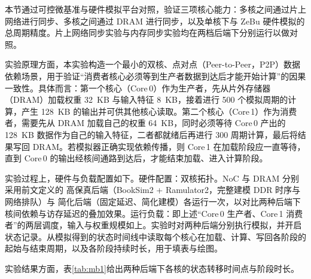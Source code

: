 

本节通过可控微基准与硬件模拟平台对照，验证三项核心能力：多核之间通过片上网络进行同步、多核之间通过 DRAM 进行同步，以及单核下与 ZeBu 硬件模拟的总周期精度。片上网络同步实验与内存同步实验均在两档后端下分别运行以做对照。


实验原理方面，本实验构造一个最小的双核、点对点（Peer-to-Peer，P2P）数据依赖场景，用于验证“消费者核心必须等到生产者数据到达后才能开始计算”的因果一致性。具体而言：第一个核心（Core\,0）作为生产者，先从片外存储器（DRAM）加载权重 \SI{32}{KB} 与输入特征 \SI{8}{KB}，接着进行 500 个模拟周期的计算，产生 \SI{128}{KB} 的输出并可供其他核心读取。第二个核心（Core\,1）作为消费者，需要先从 DRAM 加载自己的权重 \SI{64}{KB}，同时必须等待 Core\,0 产出的 \SI{128}{KB} 数据作为自己的输入特征，二者都就绪后再进行 300 周期计算，最后将结果写回 DRAM。若模拟器正确实现依赖传播，则 Core\,1 在加载阶段应一直等待，直到 Core\,0 的输出经核间通路到达后，才能结束加载、进入计算阶段。

实验过程上，硬件与负载配置如下。硬件配置：双核拓扑。NoC 与 DRAM 分别采用前文定义的 高保真后端（BookSim2 + Ramulator2，完整建模 DDR 时序与网络排队）与 简化后端（固定延迟、简化建模）各运行一次，以对比两种后端下核间依赖与访存延迟的叠加效果。运行负载：即上述“Core\,0 生产者、Core\,1 消费者”的两层调度，输入与权重规模如上。实验时对两种后端分别执行模拟，并开启状态记录。从模拟得到的状态时间线中读取每个核心在加载、计算、写回各阶段的起始与结束周期，以及各阶段持续时长，用于填表与绘图。

实验结果方面，表\ref{tab:mb1}给出两种后端下各核的状态转移时间点与阶段时长。

